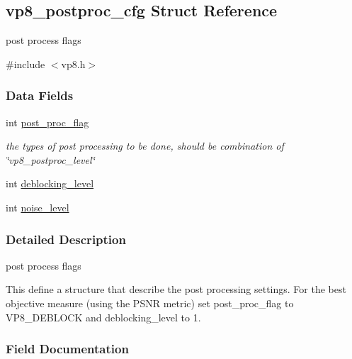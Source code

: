 \hypertarget{structvp8__postproc__cfg}{}\subsection{vp8\+\_\+postproc\+\_\+cfg Struct Reference}
\label{structvp8__postproc__cfg}


post process flags  




{\ttfamily \#include $<$vp8.\+h$>$}

\subsubsection*{Data Fields}
\begin{DoxyCompactItemize}
\item 
int \hyperlink{structvp8__postproc__cfg_ae9adc230642ac230f39eb4c531cf85e5}{post\+\_\+proc\+\_\+flag}\hypertarget{structvp8__postproc__cfg_ae9adc230642ac230f39eb4c531cf85e5}{}\label{structvp8__postproc__cfg_ae9adc230642ac230f39eb4c531cf85e5}

\begin{DoxyCompactList}\small\item\em the types of post processing to be done, should be combination of \char`\"{}vp8\+\_\+postproc\+\_\+level\char`\"{} \end{DoxyCompactList}\item 
int \hyperlink{structvp8__postproc__cfg_afe919a9546e79798d840b1492f7e0249}{deblocking\+\_\+level}
\item 
int \hyperlink{structvp8__postproc__cfg_a32f28e4003e5d9bf55d188247f3f156c}{noise\+\_\+level}
\end{DoxyCompactItemize}


\subsubsection{Detailed Description}
post process flags 

This define a structure that describe the post processing settings. For the best objective measure (using the P\+S\+NR metric) set post\+\_\+proc\+\_\+flag to V\+P8\+\_\+\+D\+E\+B\+L\+O\+CK and deblocking\+\_\+level to 1. 

\subsubsection{Field Documentation}
